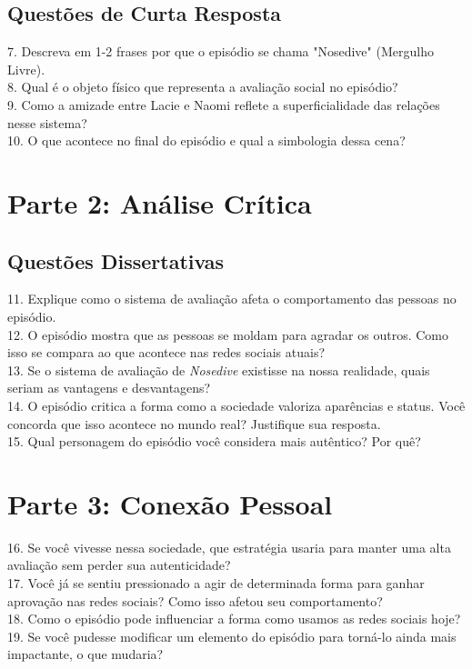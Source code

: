 \documentclass[11pt]{article}
\begin{document}
\begin{multicols}{2}
\subsection*{Questões de Curta Resposta}

7. Descreva em 1-2 frases por que o episódio se chama "Nosedive" (Mergulho Livre).\\
8. Qual é o objeto físico que representa a avaliação social no episódio?\\
9. Como a amizade entre Lacie e Naomi reflete a superficialidade das relações nesse sistema?\\
10. O que acontece no final do episódio e qual a simbologia dessa cena?\\

\section*{Parte 2: Análise Crítica}
\subsection*{Questões Dissertativas}

11. Explique como o sistema de avaliação afeta o comportamento das pessoas no episódio.\\
12. O episódio mostra que as pessoas se moldam para agradar os outros. Como isso se compara ao que acontece nas redes sociais atuais?\\
13. Se o sistema de avaliação de \textit{Nosedive} existisse na nossa realidade, quais seriam as vantagens e desvantagens?\\
14. O episódio critica a forma como a sociedade valoriza aparências e status. Você concorda que isso acontece no mundo real? Justifique sua resposta.\\
15. Qual personagem do episódio você considera mais autêntico? Por quê?\\

\section*{Parte 3: Conexão Pessoal}

16. Se você vivesse nessa sociedade, que estratégia usaria para manter uma alta avaliação sem perder sua autenticidade?\\
17. Você já se sentiu pressionado a agir de determinada forma para ganhar aprovação nas redes sociais? Como isso afetou seu comportamento?\\
18. Como o episódio pode influenciar a forma como usamos as redes sociais hoje?\\
19. Se você pudesse modificar um elemento do episódio para torná-lo ainda mais impactante, o que mudaria?\\

\end{multicols}
\end{document}
